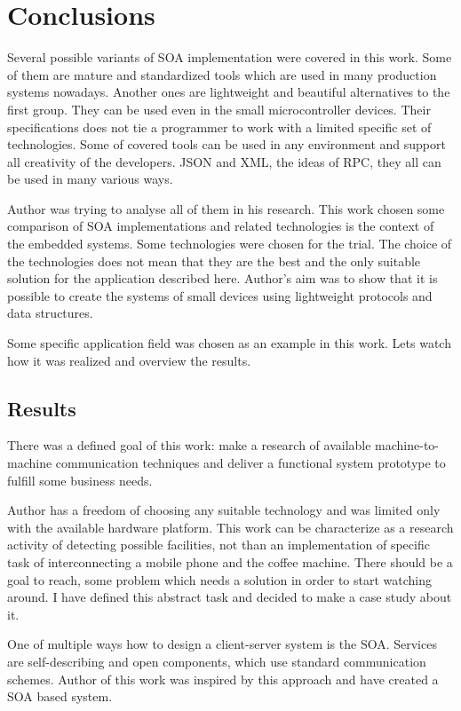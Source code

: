 \section{Conclusions}

Several possible variants of SOA implementation were covered in this work.
Some of them are mature and standardized tools which are used in many production
systems nowadays.
Another ones are lightweight and beautiful alternatives to the first group. They
can be  used even in the small microcontroller devices. 
Their specifications does not tie a programmer to work with a limited specific
set of technologies. 
Some of covered tools can be used in any environment and support all creativity
of the developers. 
JSON and XML, the ideas of RPC, they all can be used in many various ways.

Author was trying to analyse all of them in his research.
This work chosen some comparison of SOA implementations and related technologies
is the context of the embedded systems.
Some technologies were chosen for the trial.
The choice of the technologies  does not mean that they are the best and the
only suitable solution for the application described here.
Author's  aim was to show that it is possible to create the systems of small
devices using lightweight protocols and data structures.

Some specific application field was chosen as an example in this work.
Lets watch how it was realized and overview the results.

\subsection{Results}

There was a defined goal of this work: make a research of available
machine-to-machine communication techniques and deliver a functional system
prototype to fulfill some business needs.

Author has a freedom of choosing any suitable technology and was limited only
with the available hardware platform. 
This work can be characterize as a research activity of detecting possible
facilities, not than an implementation of specific task of interconnecting
a mobile phone and the coffee machine.
There should be a goal to reach, some problem which needs a solution in order to
start watching around. 
I have defined this abstract task and decided to make a
case study about it.

One of multiple ways how to design a client-server system is the
SOA. Services are self-describing and open components, which use standard
communication schemes. 
Author of this work was inspired by this approach and have created a SOA
based system.


